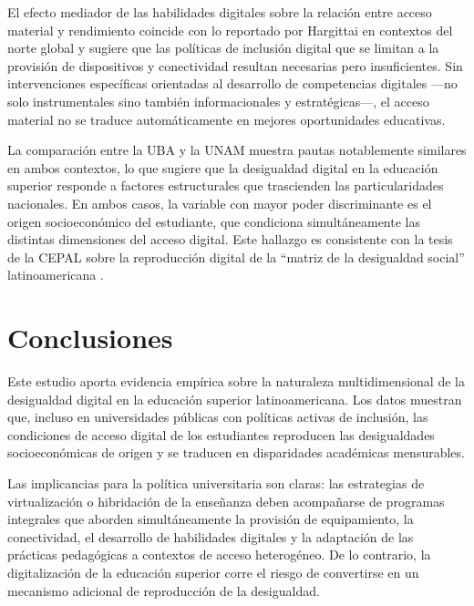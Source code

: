 El efecto mediador de las habilidades digitales sobre la relación entre acceso material y rendimiento coincide con lo reportado por Hargittai \autocite*{2565-HARGITTAI2002} en contextos del norte global y sugiere que las políticas de inclusión digital que se limitan a la provisión de dispositivos y conectividad resultan necesarias pero insuficientes. Sin intervenciones específicas orientadas al desarrollo de competencias digitales —no solo instrumentales sino también informacionales y estratégicas—, el acceso material no se traduce automáticamente en mejores oportunidades educativas.

La comparación entre la UBA y la UNAM muestra pautas notablemente similares en ambos contextos, lo que sugiere que la desigualdad digital en la educación superior responde a factores estructurales que trascienden las particularidades nacionales. En ambos casos, la variable con mayor poder discriminante es el origen socioeconómico del estudiante, que condiciona simultáneamente las distintas dimensiones del acceso digital. Este hallazgo es consistente con la tesis de la CEPAL sobre la reproducción digital de la “matriz de la desigualdad social” latinoamericana \autocite{2566-CEPAL2021}.


\section{Conclusiones}
Este estudio aporta evidencia empírica sobre la naturaleza multidimensional de la desigualdad digital en la educación superior latinoamericana. Los datos muestran que, incluso en universidades públicas con políticas activas de inclusión, las condiciones de acceso digital de los estudiantes reproducen las desigualdades socioeconómicas de origen y se traducen en disparidades académicas mensurables.

Las implicancias para la política universitaria son claras: las estrategias de virtualización o hibridación de la enseñanza deben acompañarse de programas integrales que aborden simultáneamente la provisión de equipamiento, la conectividad, el desarrollo de habilidades digitales y la adaptación de las prácticas pedagógicas a contextos de acceso heterogéneo. De lo contrario, la digitalización de la educación superior corre el riesgo de convertirse en un mecanismo adicional de reproducción de la desigualdad.


